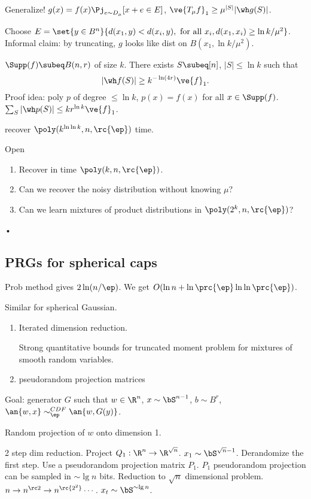 Generalize! $g(x)=f(x)\Pj_{e\sim D_\mu}[x+e\in E]$, $\ve{T_\mu f}_1\ge \mu^{|S|} |\wh g(S)|$.


Choose $E=\set{y\in B^n}{d(x_1,y)<d(x_i,y),\text{ for all }x_i,d(x_1,x_i)\ge \ln k/\mu^2}$. Informal claim: by truncating, $g$ looks like dist on $B(x_1,\ln k/\mu^2)$.

$\Supp(f)\subeq B(n,r)$ of size $k$. 
There exists $S\subeq [n]$, $|S|\le \ln k$ such that 
\[
|\wh f(S)|\ge k^{-\ln (4r)}\ve{f}_1.
\]
Proof idea: poly $p$ of degree $\le \ln k$, $p(x)=f(x)$ for all $x\in \Supp(f)$. $\sum_S|\wh p(S)| \le kr^{\ln k}\ve{f}_1$.

recover $\poly(k^{\ln\ln k}, n,\rc{\ep})$ time.

Open
\begin{enumerate}
\item
Recover in time $\poly(k,n,\rc{\ep})$.
\item
Can we recover the noisy distribution without knowing $\mu$?
\item
Can we learn mixtures of product distributions in $\poly(2^k,n,\rc{\ep})$?
\end{enumerate}•


\subsection{PRGs for spherical caps}
Prob method gives $2\ln (n/\ep)$. We get $O(\ln n + \ln \prc{\ep}\ln\ln\prc{\ep})$. 

Similar for spherical Gaussian.
\begin{enumerate}
\item
Iterated dimension reduction. 

Strong quantitative bounds for truncated moment problem for mixtures of smooth random variables. 
\item
pseudorandom projection matrices
\end{enumerate}

Goal: generator $G$ such that $w\in \R^n$, $x\sim \bS^{n-1}$, $b\sim B^r$, $\an{w,x}\sim_\ep^{CDF} \an{w,G(y)}$.

Random projection of $w$ onto dimension 1.

2 step dim reduction. Project $Q_1:\R^n\to \R^{\sqrt n}$. $x_1\sim \bS^{\sqrt n-1}$. Derandomize the first step. Use a pseudorandom projection matrix $P_1$. $P_1$ pseudorandom projection can be sampled in $\sim \lg n$ bits. Reduction to $\sqrt n$ dimensional problem. $n\to n^{\rc 2}\to n^{\rc{2^2}}\cdots$. $x_t\sim \bS^{\sim \lg n}$.

